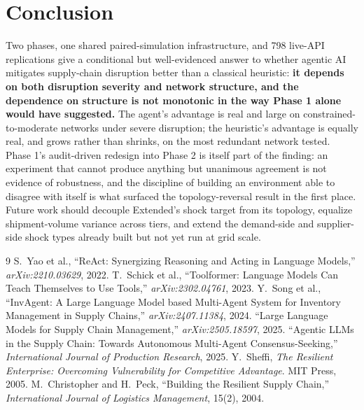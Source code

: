 \documentclass[10pt,twocolumn]{article}
\begin{document}
\section{Conclusion}
Two phases, one shared paired-simulation infrastructure, and 798 live-API replications give a conditional but well-evidenced answer to whether agentic AI mitigates supply-chain disruption better than a classical heuristic: \textbf{it depends on both disruption severity and network structure, and the dependence on structure is not monotonic in the way Phase 1 alone would have suggested.} The agent's advantage is real and large on constrained-to-moderate networks under severe disruption; the heuristic's advantage is equally real, and grows rather than shrinks, on the most redundant network tested. Phase 1's audit-driven redesign into Phase 2 is itself part of the finding: an experiment that cannot produce anything but unanimous agreement is not evidence of robustness, and the discipline of building an environment able to disagree with itself is what surfaced the topology-reversal result in the first place. Future work should decouple Extended's shock target from its topology, equalize shipment-volume variance across tiers, and extend the demand-side and supplier-side shock types already built but not yet run at grid scale.

\begin{thebibliography}{9}
\footnotesize
{} S.~Yao et al., ``ReAct: Synergizing Reasoning and Acting in Language Models,'' \emph{arXiv:2210.03629}, 2022.
 T.~Schick et al., ``Toolformer: Language Models Can Teach Themselves to Use Tools,'' \emph{arXiv:2302.04761}, 2023.
 Y.~Song et al., ``InvAgent: A Large Language Model based Multi-Agent System for Inventory Management in Supply Chains,'' \emph{arXiv:2407.11384}, 2024.
 ``Large Language Models for Supply Chain Management,'' \emph{arXiv:2505.18597}, 2025.
 ``Agentic LLMs in the Supply Chain: Towards Autonomous Multi-Agent Consensus-Seeking,'' \emph{International Journal of Production Research}, 2025.
 Y.~Sheffi, \emph{The Resilient Enterprise: Overcoming Vulnerability for Competitive Advantage}. MIT Press, 2005.
 M.~Christopher and H.~Peck, ``Building the Resilient Supply Chain,'' \emph{International Journal of Logistics Management}, 15(2), 2004.
\end{thebibliography}
\end{document}

